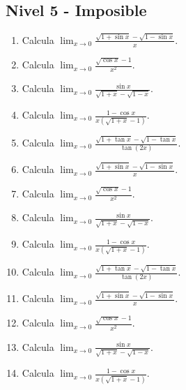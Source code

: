 \documentclass[11pt,a4paper]{article}
\begin{document}
\newpage

\subsection{Nivel 5 - Imposible}

\begin{enumerate}[label=\textbf{E\arabic*.},start=581]

\item Calcula $\displaystyle \lim_{x\to0}\frac{\sqrt{1+\sin x}-\sqrt{1-\sin x}}{x}$.

\item Calcula $\displaystyle \lim_{x\to0}\frac{\sqrt{\cos x}-1}{x^2}$.

\item Calcula $\displaystyle \lim_{x\to0}\frac{\sin x}{\sqrt{1+x}-\sqrt{1-x}}$.

\item Calcula $\displaystyle \lim_{x\to0}\frac{1-\cos x}{x(\sqrt{1+x}-1)}$.

\item Calcula $\displaystyle \lim_{x\to0}\frac{\sqrt{1+\tan x}-\sqrt{1-\tan x}}{\tan(2x)}$.

\item Calcula $\displaystyle \lim_{x\to0}\frac{\sqrt{1+\sin x}-\sqrt{1-\sin x}}{x}$.

\item Calcula $\displaystyle \lim_{x\to0}\frac{\sqrt{\cos x}-1}{x^2}$.

\item Calcula $\displaystyle \lim_{x\to0}\frac{\sin x}{\sqrt{1+x}-\sqrt{1-x}}$.

\item Calcula $\displaystyle \lim_{x\to0}\frac{1-\cos x}{x(\sqrt{1+x}-1)}$.

\item Calcula $\displaystyle \lim_{x\to0}\frac{\sqrt{1+\tan x}-\sqrt{1-\tan x}}{\tan(2x)}$.

\item Calcula $\displaystyle \lim_{x\to0}\frac{\sqrt{1+\sin x}-\sqrt{1-\sin x}}{x}$.

\item Calcula $\displaystyle \lim_{x\to0}\frac{\sqrt{\cos x}-1}{x^2}$.

\item Calcula $\displaystyle \lim_{x\to0}\frac{\sin x}{\sqrt{1+x}-\sqrt{1-x}}$.

\item Calcula $\displaystyle \lim_{x\to0}\frac{1-\cos x}{x(\sqrt{1+x}-1)}$.


\end{enumerate}
\end{document}
